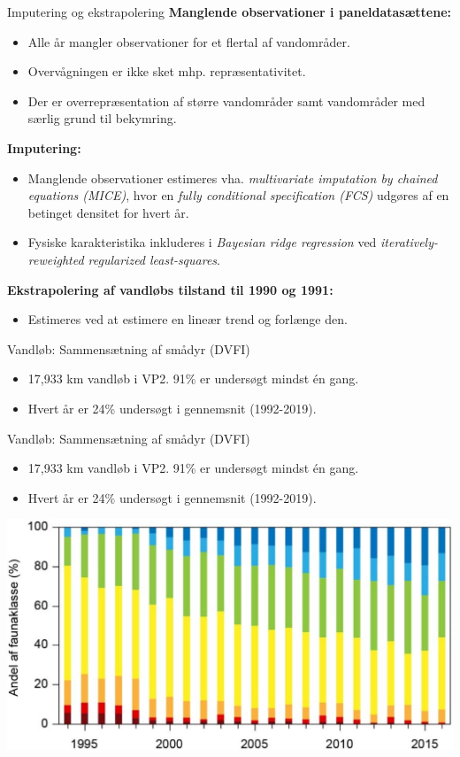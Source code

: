 \begin{frame}{Imputering og ekstrapolering}
  \textbf{Manglende observationer i paneldatasættene:}
  \begin{itemize}
    \item Alle år mangler observationer for et flertal af vandområder.
    \item Overvågningen er ikke sket mhp. repræsentativitet.
    \item Der er overrepræsentation af større vandområder samt vandområder med særlig grund til bekymring.
  \end{itemize}
  \textbf{Imputering:}
  \begin{itemize}
    \item Manglende observationer estimeres vha. \textit{multivariate imputation by chained equations (MICE)}, hvor en \textit{fully conditional specification (FCS)} udgøres af en betinget densitet for hvert år.
    \item Fysiske karakteristika inkluderes i \textit{Bayesian ridge regression} ved \textit{iteratively-reweighted regularized least-squares}.
  \end{itemize}
  \textbf{Ekstrapolering af vandløbs tilstand til 1990 og 1991:}
  \begin{itemize}
    \item Estimeres ved at estimere en lineær trend og forlænge den.
  \end{itemize}
\end{frame}

\begin{frame}{Vandløb: Sammensætning af smådyr (DVFI)}
  \begin{itemize}
    \item 17,933 km vandløb i VP2. 91\% er undersøgt mindst én gang.
    \item Hvert år er 24\% undersøgt i gennemsnit (1992-2019).
  \end{itemize}
  \vfill
\end{frame}
\begin{frame}{Vandløb: Sammensætning af smådyr (DVFI)}
  \begin{itemize}
    \item 17,933 km vandløb i VP2. 91\% er undersøgt mindst én gang.
    \item Hvert år er 24\% undersøgt i gennemsnit (1992-2019).
  \end{itemize}
  \includegraphics[width=\textwidth]{figures/DVFI}
\end{frame}

